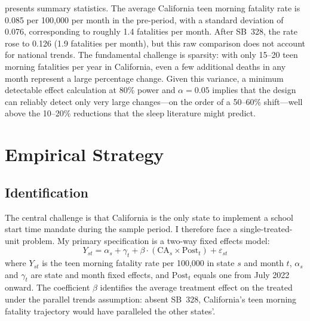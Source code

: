 \documentclass[12pt]{article}
\begin{document}


 presents summary statistics. The average California teen morning fatality rate is 0.085 per 100,000 per month in the pre-period, with a standard deviation of 0.076, corresponding to roughly 1.4 fatalities per month. After SB~328, the rate rose to 0.126 (1.9 fatalities per month), but this raw comparison does not account for national trends. The fundamental challenge is sparsity: with only 15--20 teen morning fatalities per year in California, even a few additional deaths in any month represent a large percentage change. Given this variance, a minimum detectable effect calculation at 80\% power and $\alpha = 0.05$ implies that the design can reliably detect only very large changes---on the order of a 50--60\% shift---well above the 10--20\% reductions that the sleep literature might predict.

\section{Empirical Strategy}

\subsection{Identification}

The central challenge is that California is the only state to implement a school start time mandate during the sample period. I therefore face a single-treated-unit problem. My primary specification is a two-way fixed effects model:
\begin{equation}
Y_{st} = \alpha_s + \gamma_t + \beta \cdot (\text{CA}_s \times \text{Post}_t) + \varepsilon_{st}
\label{eq:twfe}
\end{equation}
where $Y_{st}$ is the teen morning fatality rate per 100,000 in state $s$ and month $t$, $\alpha_s$ and $\gamma_t$ are state and month fixed effects, and $\text{Post}_t$ equals one from July 2022 onward. The coefficient $\beta$ identifies the average treatment effect on the treated under the parallel trends assumption: absent SB~328, California's teen morning fatality trajectory would have paralleled the other states'.
\end{document}
